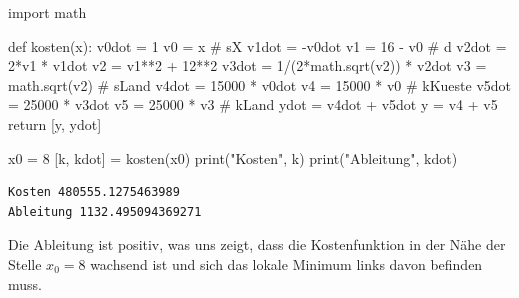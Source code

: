 \documentclass[
  a4paper,
  DIV=11]{scrreprt}
\newenvironment{Shaded}{\begin{snugshade}}{\end{snugshade}}
\newcommand{\BuiltInTok}[1]{\textcolor[rgb]{0.00,0.23,0.31}{#1}}
\newcommand{\CommentTok}[1]{\textcolor[rgb]{0.37,0.37,0.37}{#1}}
\newcommand{\ControlFlowTok}[1]{\textcolor[rgb]{0.00,0.23,0.31}{#1}}
\newcommand{\DecValTok}[1]{\textcolor[rgb]{0.68,0.00,0.00}{#1}}
\newcommand{\ImportTok}[1]{\textcolor[rgb]{0.00,0.46,0.62}{#1}}
\newcommand{\KeywordTok}[1]{\textcolor[rgb]{0.00,0.23,0.31}{#1}}
\newcommand{\NormalTok}[1]{\textcolor[rgb]{0.00,0.23,0.31}{#1}}
\newcommand{\OperatorTok}[1]{\textcolor[rgb]{0.37,0.37,0.37}{#1}}
\newcommand{\StringTok}[1]{\textcolor[rgb]{0.13,0.47,0.30}{#1}}
\theoremstyle{definition}
\theoremstyle{definition}
\theoremstyle{remark}
\begin{document}
\begin{tcolorbox}[enhanced jigsaw, titlerule=0mm, title=\textcolor{quarto-callout-tip-color}{\faLightbulb}\hspace{0.5em}{Lösung}, breakable, coltitle=black, leftrule=.75mm, bottomrule=.15mm, colback=white, rightrule=.15mm, opacitybacktitle=0.6, bottomtitle=1mm, toptitle=1mm, left=2mm, toprule=.15mm, colbacktitle=quarto-callout-tip-color!10!white, colframe=quarto-callout-tip-color-frame, arc=.35mm, opacityback=0]

\begin{Shaded}
\begin{Highlighting}[]
\ImportTok{import}\NormalTok{ math}

\KeywordTok{def}\NormalTok{ kosten(x):}
\NormalTok{    v0dot }\OperatorTok{=} \DecValTok{1}
\NormalTok{    v0 }\OperatorTok{=}\NormalTok{ x       }\CommentTok{\# sX}
\NormalTok{    v1dot }\OperatorTok{=} \OperatorTok{{-}}\NormalTok{v0dot}
\NormalTok{    v1 }\OperatorTok{=} \DecValTok{16} \OperatorTok{{-}}\NormalTok{ v0 }\CommentTok{\# d}
\NormalTok{    v2dot }\OperatorTok{=} \DecValTok{2}\OperatorTok{*}\NormalTok{v1 }\OperatorTok{*}\NormalTok{ v1dot}
\NormalTok{    v2 }\OperatorTok{=}\NormalTok{ v1}\OperatorTok{**}\DecValTok{2} \OperatorTok{+} \DecValTok{12}\OperatorTok{**}\DecValTok{2}
\NormalTok{    v3dot }\OperatorTok{=} \DecValTok{1}\OperatorTok{/}\NormalTok{(}\DecValTok{2}\OperatorTok{*}\NormalTok{math.sqrt(v2)) }\OperatorTok{*}\NormalTok{ v2dot}
\NormalTok{    v3 }\OperatorTok{=}\NormalTok{ math.sqrt(v2) }\CommentTok{\# sLand}
\NormalTok{    v4dot }\OperatorTok{=} \DecValTok{15000} \OperatorTok{*}\NormalTok{ v0dot}
\NormalTok{    v4 }\OperatorTok{=} \DecValTok{15000} \OperatorTok{*}\NormalTok{ v0 }\CommentTok{\# kKueste}
\NormalTok{    v5dot }\OperatorTok{=} \DecValTok{25000} \OperatorTok{*}\NormalTok{ v3dot}
\NormalTok{    v5 }\OperatorTok{=} \DecValTok{25000} \OperatorTok{*}\NormalTok{ v3 }\CommentTok{\# kLand}
\NormalTok{    ydot }\OperatorTok{=}\NormalTok{ v4dot }\OperatorTok{+}\NormalTok{ v5dot}
\NormalTok{    y }\OperatorTok{=}\NormalTok{ v4 }\OperatorTok{+}\NormalTok{ v5}
    \ControlFlowTok{return}\NormalTok{ [y, ydot]}

\NormalTok{x0 }\OperatorTok{=} \DecValTok{8}
\NormalTok{[k, kdot] }\OperatorTok{=}\NormalTok{ kosten(x0)}
\BuiltInTok{print}\NormalTok{(}\StringTok{"Kosten"}\NormalTok{, k)}
\BuiltInTok{print}\NormalTok{(}\StringTok{"Ableitung"}\NormalTok{, kdot)}
\end{Highlighting}
\end{Shaded}

\begin{verbatim}
Kosten 480555.1275463989
Ableitung 1132.495094369271
\end{verbatim}

Die Ableitung ist positiv, was uns zeigt, dass die Kostenfunktion in der
Nähe der Stelle \(x_0=8\) wachsend ist und sich das lokale Minimum links
davon befinden muss.

\end{tcolorbox}
\end{document}
